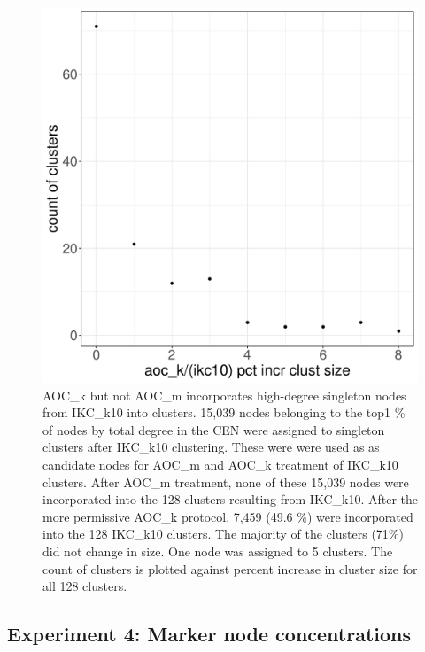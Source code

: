 \documentclass[12pt, oneside]{article}   	%
\begin{document}
\begin{figure}[H]
	\centering
	 \includegraphics[width=0.7\linewidth]{singletons.pdf} 
\caption{AOC\_k but not AOC\_m incorporates high-degree singleton nodes from IKC\_k10 into clusters. 15,039 nodes belonging to the top1 \% of nodes by total degree in the CEN were assigned to singleton clusters after IKC\_k10 clustering. These were were used as as candidate nodes for AOC\_m and AOC\_k treatment of IKC\_k10 clusters. After AOC\_m treatment, none of these 15,039 nodes were incorporated into the 128 clusters resulting from  IKC\_k10. After the more permissive AOC\_k protocol, 7,459 (49.6 \%) were incorporated into the 128 IKC\_k10 clusters. The majority of the clusters (71\%) did not change in size. One node was assigned to 5 clusters. The count of clusters is plotted against percent increase in cluster size for all 128 clusters.}
\label{fig:singleton}
\end{figure}


\subsection{Experiment 4: Marker node concentrations}
\end{document}
